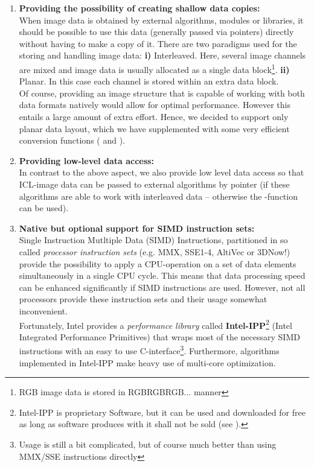 \begin{enumerate}
\item \textbf{Providing the possibility of creating shallow data copies:}\\
When image data is obtained by external algorithms, modules or libraries, it should be possible to use this data (generally passed via pointers) directly without having to make a copy of it. There are two paradigms used for the storing and handling image data: \small{\textbf{i)}} Interleaved. Here, several image channels are mixed and image data is usually allocated as a single data block\footnote{RGB image data is stored in RGBRGBRGB... manner}. \small{\textbf{ii)}} Planar. In this case each channel is stored within an extra data block.\\
Of course, providing an image structure that is capable of working with both data formats natively would allow for optimal performance. However this entails a large amount of extra effort. Hence, we decided to support only planar data layout, which we have supplemented with some very efficient conversion functions ( and  ).
\item \textbf{Providing low-level data access:}\\
In contrast to the above aspect, we also provide low level data access so that ICL-image data can be passed to external algorithms by pointer (if these algorithms are able to work with interleaved data -- otherwise the -function can be used).
\item \textbf{Native but optional support for SIMD instruction sets:}\\
Single Instruction Mutltiple Data (SIMD) Instructions, partitioned in so called \emph{processor instruction sets} (e.g. MMX, SSE1-4, AltiVec or 3DNow!) provide the possibility to apply a CPU-operation on a set of data elements simultaneously in a single CPU cycle. This means that data processing speed can be enhanced significantly if SIMD instructions are used. However, not all processors provide these instruction sets and their usage somewhat inconvenient.\\
Fortunately, Intel provides a \emph{performance library} called \textbf{Intel-IPP}\footnote{Intel-IPP is proprietary Software, but it can be used and downloaded  for free as long as software produces with it shall not be sold (see ).} (Intel Integrated Performance Primitives) that wraps most of the necessary SIMD instructions with an easy to use C-interface\footnote{Usage is still a bit complicated, but of course much better than using MMX/SSE instructions directly}. Furthermore, algorithms implemented in Intel-IPP make heavy use of multi-core optimization.


\end{enumerate}
